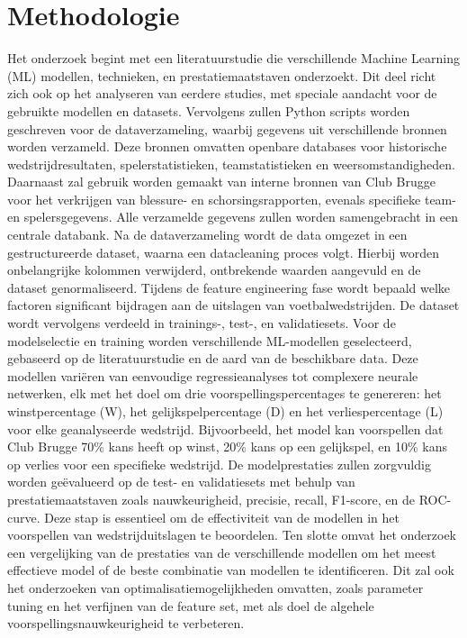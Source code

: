 
\section{Methodologie}%
\label{sec:methodologie}

Het onderzoek begint met een literatuurstudie die verschillende Machine Learning (ML) modellen, technieken, en prestatiemaatstaven onderzoekt. Dit deel richt zich ook op het analyseren van eerdere studies, met speciale aandacht voor de gebruikte modellen en datasets.
Vervolgens zullen Python scripts worden geschreven voor de dataverzameling, waarbij gegevens uit verschillende bronnen worden verzameld. Deze bronnen omvatten openbare databases voor historische wedstrijdresultaten, spelerstatistieken, teamstatistieken en weersomstandigheden. Daarnaast zal gebruik worden gemaakt van interne bronnen van Club Brugge voor het verkrijgen van blessure- en schorsingsrapporten, evenals specifieke team- en spelersgegevens. Alle verzamelde gegevens zullen worden samengebracht in een centrale databank.
Na de dataverzameling wordt de data omgezet in een gestructureerde dataset, waarna een datacleaning proces volgt. Hierbij worden onbelangrijke kolommen verwijderd, ontbrekende waarden aangevuld en de dataset genormaliseerd. Tijdens de feature engineering fase wordt bepaald welke factoren significant bijdragen aan de uitslagen van voetbalwedstrijden. De dataset wordt vervolgens verdeeld in trainings-, test-, en validatiesets.
Voor de modelselectie en training worden verschillende ML-modellen geselecteerd, gebaseerd op de literatuurstudie en de aard van de beschikbare data. Deze modellen variëren van eenvoudige regressieanalyses tot complexere neurale netwerken, elk met het doel om drie voorspellingspercentages te genereren: het winstpercentage (W), het gelijkspelpercentage (D) en het verliespercentage (L) voor elke geanalyseerde wedstrijd. Bijvoorbeeld, het model kan voorspellen dat Club Brugge 70\% kans heeft op winst, 20\% kans op een gelijkspel, en 10\% kans op verlies voor een specifieke wedstrijd.
De modelprestaties zullen zorgvuldig worden geëvalueerd op de test- en validatiesets met behulp van prestatiemaatstaven zoals nauwkeurigheid, precisie, recall, F1-score, en de ROC-curve. Deze stap is essentieel om de effectiviteit van de modellen in het voorspellen van wedstrijduitslagen te beoordelen.
Ten slotte omvat het onderzoek een vergelijking van de prestaties van de verschillende modellen om het meest effectieve model of de beste combinatie van modellen te identificeren. Dit zal ook het onderzoeken van optimalisatiemogelijkheden omvatten, zoals parameter tuning en het verfijnen van de feature set, met als doel de algehele voorspellingsnauwkeurigheid te verbeteren.

